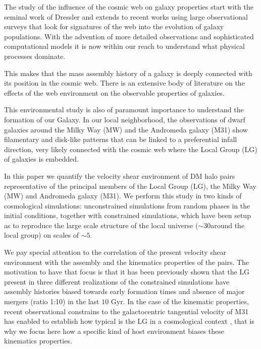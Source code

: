 \documentclass[usenatbib]{latex/mn2e}
\begin{document}
The study of the influence of the cosmic web on galaxy properties
start with the seminal work of Dressler  and
extends to recent works using large observational surveys that look
for signatures of the web into the evolution of galaxy
populations. With the advention of more detailed observations and
sophisticated computational models it is now within our reach to
understand what physical processes dominate.

This makes  that the mass
assembly history of a galaxy is deeply connected with its  position in
the cosmic web. There is an extensive body of literature on  the
effects of the web environment on the observable properties of
galaxies. 


This environmental study is also of paramount importance to understand
the formation of our Galaxy. In our local neighborhood, the
observations of dwarf galaxies around the Milky Way (MW) and the
Andromeda galaxy (M31) show filamentary and disk-like patterns that
can be linked to a preferential infall direction, very likely
connected with the cosmic web where the Local Group (LG) of galaxies
is embedded. 

In this paper we quantify the velocity shear environment of DM halo pairs
representative of the principal members of the Local Group (LG), the Milky 
Way (MW) and Andromeda galaxy (M31). We perform this study in two kinds of 
cosmological simulations: unconstrained simulations from random phases in 
the initial conditions, together with constrained simulations, which have 
been setup as to reproduce the large scale structure of the local universe
($\sim 30$\hMpc around the local group) on scales of $\sim 5$\hMpc. 


We pay special attention to the correlation of the present velocity shear 
environment with the assembly and the kinematics properties of the pairs. 
The motivation to have that focus is that it has been previously shown that 
the LG present in three different realizations of the constrained simulations 
have assembly histories biased towards early formation times and absence of 
major mergers (ratio 1:10) in the last $10$ Gyr. In the case of the kinematic
properties, recent observational constrains to the galactocentric tangential 
velocity of M31 has enabled to establish how typical is the LG in a 
cosmological context , that is why
we focus here how a specific kind of host environment biases these kinematics
properties.


\end{document}
